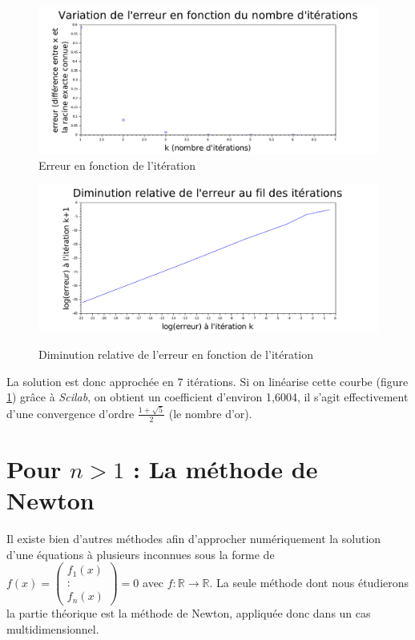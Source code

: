 \documentclass[a4paper,10pt]{report}
\begin{document}
\begin{center}
\begin{figure}[H]
\caption{Erreur en fonction de l'itération}
\includegraphics[width=\textwidth]{graphsecante.pdf}
\end{figure}

\begin{figure}[H]
\caption{Diminution relative de l'erreur en fonction de l'itération}
\includegraphics[width=\textwidth]{graphsecante_reg.pdf}
\label{erreur_secante}
\end{figure}
\end{center}

La solution est donc approchée en 7 itérations. Si on linéarise cette courbe (figure \ref{erreur_secante}) grâce à \textit{Scilab}, on obtient un coefficient d'environ 1,6004, il s'agit effectivement d'une convergence d'ordre $\frac{1+\sqrt{5}}{2}$ (le nombre d'or).

\newpage
\section{Pour $n>1$ : La méthode de Newton}
Il existe bien d'autres méthodes afin d'approcher numériquement la solution d'une équations à plusieurs inconnues sous la forme de $f(x) = \left( \begin{array}{c} f_{1}(x) \\ \colon \\ f_{n}(x) \end{array} \right)=0$ avec $f : \mathbb{R} \longrightarrow \mathbb{R}$. La seule méthode dont nous étudierons la partie théorique est la méthode de Newton, appliquée donc dans un cas multidimensionnel.
\end{document}
